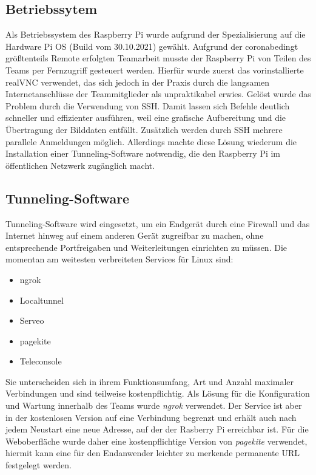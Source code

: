 \subsection{Betriebssytem}
Als Betriebssystem des Raspberry Pi wurde aufgrund der Spezialisierung auf die Hardware Pi OS (Build vom 30.10.2021) gewählt. Aufgrund der coronabedingt größtenteils Remote erfolgten Teamarbeit musste der Raspberry Pi von Teilen des Teams per Fernzugriff gesteuert werden. Hierfür wurde zuerst das vorinstallierte realVNC verwendet, das sich jedoch in der Praxis durch die langsamen Internetanschlüsse der Teammitglieder als unpraktikabel erwies. Gelöst wurde das Problem durch die Verwendung von SSH. Damit lassen sich Befehle deutlich schneller und effizienter ausführen, weil eine grafische Aufbereitung und die Übertragung der Bilddaten entfällt. Zusätzlich werden durch SSH mehrere parallele Anmeldungen möglich. Allerdings machte diese Lösung wiederum die Installation einer Tunneling-Software notwendig, die den Raspberry Pi im öffentlichen Netzwerk zugänglich macht. 


\subsection{Tunneling-Software}
Tunneling-Software wird eingesetzt, um ein Endgerät durch eine Firewall und das Internet hinweg auf einem anderen Gerät zugreifbar zu machen, ohne entsprechende Portfreigaben und Weiterleitungen einrichten zu müssen. Die momentan am weitesten verbreiteten Services für Linux sind: \autocite[Vgl.][]{tunnel} %
\begin{itemize}
	\item ngrok
	\item Localtunnel
	\item Serveo
	\item pagekite
	\item Teleconsole
\end{itemize}
Sie unterscheiden sich in ihrem Funktionsumfang, Art und Anzahl maximaler Verbindungen und sind teilweise kostenpflichtig.
Als Lösung für die Konfiguration und Wartung innerhalb des Teams wurde \textit{ngrok} verwendet. Der Service ist aber in der kostenlosen Version auf eine Verbindung begrenzt und erhält auch nach jedem Neustart eine neue Adresse, auf der der Rasberry Pi erreichbar ist.
Für die Weboberfläche wurde daher eine kostenpflichtige Version von \textit{pagekite} verwendet, hiermit kann eine für den Endanwender leichter zu merkende permanente URL festgelegt werden.


